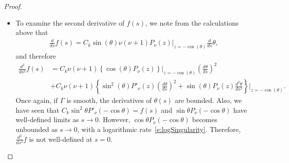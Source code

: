 \documentclass[final]{siamltex}
\begin{document}
\begin{proof}
\begin{itemize}
  \item To examine the second derivative of $f(s)$, we note from the
  calculations above that
  \begin{align*}
    \frac{d}{ds}f(s) =  C_{k}\sin(\theta) \nu(\nu+1)
    P_\nu(z)\vert_{z=-\cos(\theta)} \frac{d}{ds}\theta,
  \end{align*}
  and therefore
  \begin{align*}
    \frac{d^2}{ds^2}f(s) &=  C_{k}\nu(\nu+1)\left\{
    \cos(\theta) P_\nu(z)
    \right\}\vert_{z=-\cos(\theta)}(\frac{d\theta}{ds})^2 \\
    &+ C_{k}\nu(\nu+1)\left\{\sin^2(\theta) P'_{\nu}(z) 
      (\frac{d\theta}{ds})^2 + \sin(\theta)P_\nu(z) 
      \frac{d^2 \theta}{ds^2}\right\}\vert_{z=-\cos(\theta)}.
  \end{align*}
  Once again, if $\Gamma$ is smooth, the derivatives of $\theta(s)$ are
  bounded. Also, we have seen that $C_{k}\sin^{2} \theta
  P'_{\nu}(-\cos\theta) = f(s)$ and $\sin \theta P_{\nu}(-\cos \theta)$
  have well-defined limits as $s\rightarrow 0$. However, $ \cos \theta
  P_{\nu}(-\cos \theta)$ becomes unbounded as $s\rightarrow 0$, with a
  logarithmic rate~\eqref{e:logSingularity}.  Therefore,
  $\frac{d^2}{ds^2}f$ is not well-defined at $s=0$.

\end{itemize}

\end{proof}



\end{document}
